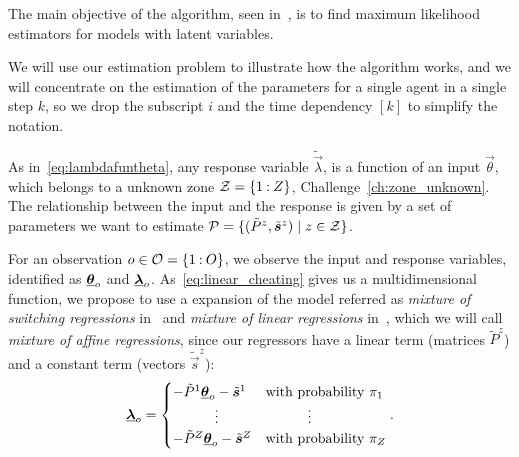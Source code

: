 \documentclass{ifacconf}  %
\begin{document}
The main objective of the \EM{} algorithm, seen in~\cite{DempsterEtAl1977}, is to find maximum likelihood estimators for models with latent variables.

We will use our estimation problem to illustrate how the algorithm works, and
we will concentrate on the estimation of the parameters for a single agent in a single step $k$, so we drop the subscript $i$ and the time dependency $[k]$ to simplify the notation.

As in~\eqref{eq:lambdafuntheta},  any response variable $\tilde{\vec{\lambda}}$, is a function of an input $\vec{\theta}$, which belongs to a unknown zone ${\mathcal{Z}=\{1\mathbin{:}Z\}}$, Challenge~\ref{ch:zone_unknown}.
The relationship between the input and the response is given by a set of parameters we want to estimate ${\mathcal{P}=\{(\tilde{P}^{z},\tilde{\boldsymbol{s}}^{z})\mid z\in\mathcal{Z}\}}$.

For an observation ${o\in\mathcal{O}=\{1\mathbin{:}O\}}$, we observe the input and response variables, identified as  ${\underline{\boldsymbol{\theta}}_{o}}$ and ${\underline{\boldsymbol{\lambda}}_{o}}$.
As~\eqref{eq:linear_cheating} gives us a multidimensional \pwa{} function, we propose to use a expansion of the model referred as \emph{mixture of switching regressions} in~\cite{QuandtRamsey1978} and \emph{mixture of linear regressions} in~\cite{FariaSoromenho2010}, which we will call \emph{mixture of affine regressions}, since our regressors have a linear term (matrices $\tilde{P}^{z}$) and a constant term (vectors $\tilde{\vec{s}}^{z}$):
\begin{equation}
  \label{eq:linear_cheating_random}
  {\underline{\boldsymbol{\lambda}}}_{o}=
  \begin{cases}
    -\tilde{P}^{1}{\underline{\boldsymbol{\theta}}}_{o}-\tilde{\boldsymbol{s}}^{1}&\text{with probability}\ \pi_{1} \\
    \qquad\quad \vdots&\qquad\quad \vdots\\
    -\tilde{P}^{Z}{\underline{\boldsymbol{\theta}}}_{o}-\tilde{\boldsymbol{s}}^{Z}&\text{with probability}\ \pi_{Z} \\
  \end{cases}.
\end{equation}
\end{document}

